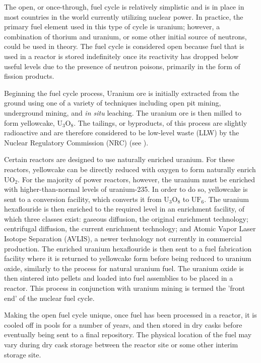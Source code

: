 The open, or once-through, fuel cycle is relatively simplistic and is in place
in most countries in the world currently utilizing nuclear power. In practice,
the primary fuel element used in this type of cycle is uranium; however, a
combination of thorium and uranium, or some other initial source of neutrons,
could be used in theory. The fuel cycle is considered open because fuel that is
used in a reactor is stored indefinitely once its reactivity has dropped below
useful levels due to the presence of neutron poisons, primarily in the form of
fission products.

Beginning the fuel cycle process, Uranium ore is initially extracted from the
ground using one of a variety of techniques including open pit mining,
underground mining, and \textit{in situ} leaching. The uranium ore is then
milled to form yellowcake, $\mathrm{U_3O_8}$. The tailings, or byproducts, of
this process are slightly radioactive and are therefore considered to be
low-level waste (LLW) by the Nuclear Regulatory Commission (NRC)
(see \cite{nrc_10_1985}).

Certain reactors are designed to use naturally enriched uranium. For these
reactors, yellowcake can be directly reduced with oxygen to form naturally
enrich $\mathrm{UO_2}$. For the majority of power reactors, however, the uranium
must be enriched with higher-than-normal levels of uranium-235. In order to do
so, yellowcake is sent to a conversion facility, which converts it from
$\mathrm{U_3O_8}$ to $\mathrm{UF_6}$. The uranium hexaflouride is then enriched
to the required level in an enrichment facility, of which three classes exist:
gaseous diffusion, the original enrichment technology; centrifugal diffusion,
the current enrichment technology; and Atomic Vapor Laser Isotope Separation
(AVLIS), a newer technology not currently in commercial production. The enriched
uranium hexaflouride is then sent to a fuel fabrication facility where it is
returned to yellowcake form before being reduced to uranium oxide, similarly to
the process for natural uranium fuel. The uranium oxide is then sintered into
pellets and loaded into fuel assemblies to be placed in a reactor. This process
in conjunction with uranium mining is termed the 'front end' of the nuclear fuel
cycle.

Making the open fuel cycle unique, once fuel has been processed in a reactor, it
is cooled off in pools for a number of years, and then stored in dry casks
before eventually being sent to a final repository. The physical location of the
fuel may vary during dry cask storage between the reactor site or some other
interim storage site.

